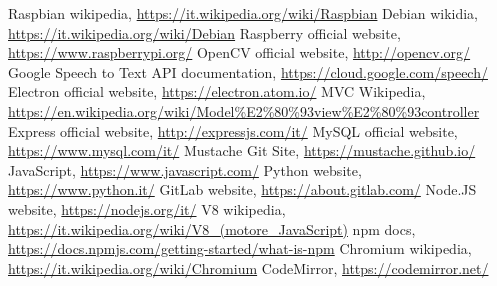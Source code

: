 \begin{thebibliography}{99}
\raggedright

 Raspbian wikipedia, \url{https://it.wikipedia.org/wiki/Raspbian}
 Debian wikidia, \url{https://it.wikipedia.org/wiki/Debian}
 Raspberry official website, \url{https://www.raspberrypi.org/}
 OpenCV official website, \url{http://opencv.org/}
 Google Speech to Text API documentation, \url{https://cloud.google.com/speech/}
 Electron official website, \url{https://electron.atom.io/}
 MVC Wikipedia, \url{https://en.wikipedia.org/wiki/Model%E2%80%93view%E2%80%93controller}
 Express official website, \url{http://expressjs.com/it/}
 MySQL official website, \url{https://www.mysql.com/it/}
 Mustache Git Site, \url{https://mustache.github.io/}
 JavaScript, \url{https://www.javascript.com/}
 Python website, \url{https://www.python.it/}
 GitLab website, \url{https://about.gitlab.com/}
 Node.JS website, \url{https://nodejs.org/it/}
 V8 wikipedia, \url{https://it.wikipedia.org/wiki/V8_(motore_JavaScript)}
 npm docs, \url{https://docs.npmjs.com/getting-started/what-is-npm}
 Chromium wikipedia, \url{https://it.wikipedia.org/wiki/Chromium}
 CodeMirror, \url{https://codemirror.net/}

\end{thebibliography}
